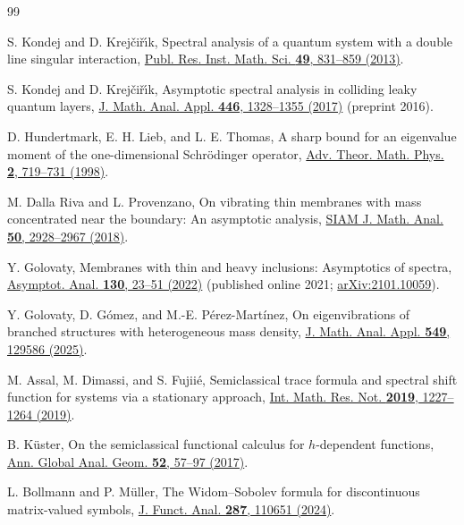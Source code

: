 \documentclass[aps,pra,reprint,superscriptaddress,longbibliography]{revtex4-2}
\begin{document}
\begin{thebibliography}{99}

S. Kondej and D. Krej\v{c}i\v{r}\'{\i}k,
Spectral analysis of a quantum system with a double line singular interaction,
\href{https://doi.org/10.4171/PRIMS/121}
{Publ. Res. Inst. Math. Sci. \textbf{49}, 831--859 (2013)}.

S. Kondej and D. Krej\v{c}i\v{r}\'{\i}k,
Asymptotic spectral analysis in colliding leaky quantum layers,
\href{https://arxiv.org/abs/1606.07273}
{J. Math. Anal. Appl. \textbf{446}, 1328--1355 (2017)}
(preprint 2016).

D. Hundertmark, E. H. Lieb, and L. E. Thomas,
A sharp bound for an eigenvalue moment of the one-dimensional
Schr\"odinger operator,
\href{https://arxiv.org/abs/math-ph/9806012}
{Adv. Theor. Math. Phys. \textbf{2}, 719--731 (1998)}.

M. Dalla Riva and L. Provenzano,
On vibrating thin membranes with mass concentrated near the boundary:
An asymptotic analysis,
\href{https://doi.org/10.1137/17M1118221}
{SIAM J. Math. Anal. \textbf{50}, 2928--2967 (2018)}.

Y. Golovaty,
Membranes with thin and heavy inclusions: Asymptotics of spectra,
\href{https://doi.org/10.3233/ASY-211743}
{Asymptot. Anal. \textbf{130}, 23--51 (2022)}
(published online 2021; \href{https://arxiv.org/abs/2101.10059}{arXiv:2101.10059}).

Y. Golovaty, D. G\'omez, and M.-E. P\'erez-Mart\'inez,
On eigenvibrations of branched structures with heterogeneous mass density,
\href{https://doi.org/10.1016/j.jmaa.2025.129586}
{J. Math. Anal. Appl. \textbf{549}, 129586 (2025)}.

M. Assal, M. Dimassi, and S. Fujii\'{e},
Semiclassical trace formula and spectral shift function for systems
via a stationary approach,
\href{https://doi.org/10.1093/imrn/rnx149}
{Int. Math. Res. Not. \textbf{2019}, 1227--1264 (2019)}.

B. K\"uster,
On the semiclassical functional calculus for $h$-dependent functions,
\href{https://doi.org/10.1007/s10455-017-9549-1}
{Ann. Global Anal. Geom. \textbf{52}, 57--97 (2017)}.

L. Bollmann and P. M\"uller,
The Widom--Sobolev formula for discontinuous matrix-valued symbols,
\href{https://doi.org/10.1016/j.jfa.2024.110651}
{J. Funct. Anal. \textbf{287}, 110651 (2024)}.


\end{thebibliography}
\end{document}
